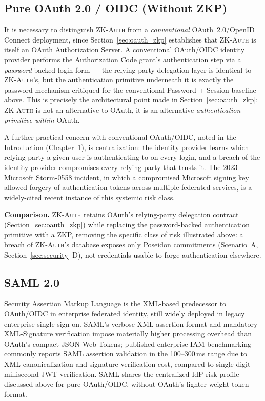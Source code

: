 \documentclass[12pt,a4paper,oneside]{report}
\begin{document}
\subsection{Pure OAuth 2.0 / OIDC (Without ZKP)}

It is necessary to distinguish \textsc{ZK-Auth} from a
\textit{conventional} OAuth~2.0/OpenID Connect deployment, since
Section~\ref{sec:oauth_zkp} establishes that \textsc{ZK-Auth} is itself
an OAuth Authorization Server. A conventional OAuth/OIDC identity
provider performs the
Authorization Code grant's authentication step via a
\textit{password}-backed login form --- the relying-party delegation
layer is identical to \textsc{ZK-Auth}'s, but the authentication
primitive underneath it is exactly the password mechanism critiqued for
the conventional Password + Session baseline above. This is precisely the architectural point made in
Section~\ref{sec:oauth_zkp}: \textsc{ZK-Auth} is not an alternative to
OAuth, it is an alternative \textit{authentication primitive within}
OAuth.

A further practical concern with conventional OAuth/OIDC, noted in the
Introduction (Chapter~1), is centralization: the identity provider
learns which relying party a given user is authenticating to on every
login, and a breach of the identity provider compromises every relying
party that trusts it. The 2023 Microsoft Storm-0558 incident, in which a
compromised Microsoft signing key allowed forgery of authentication
tokens across multiple federated services, is a widely-cited recent
instance of this systemic risk class.

\textbf{Comparison.} \textsc{ZK-Auth} retains OAuth's relying-party
delegation contract (Section~\ref{sec:oauth_zkp}) while replacing the
password-backed authentication primitive with a ZKP, removing the
specific class of risk illustrated above: a breach of \textsc{ZK-Auth}'s
database exposes only Poseidon commitments (Scenario~A,
Section~\ref{sec:security}-D), not credentials usable to forge
authentication elsewhere.

\subsection{SAML 2.0}

Security Assertion Markup Language is the XML-based
predecessor to OAuth/OIDC in enterprise federated identity, still
widely deployed in legacy enterprise single-sign-on. SAML's
verbose XML assertion format and mandatory XML-Signature verification
impose materially higher processing overhead than OAuth's compact JSON
Web Tokens; published enterprise IAM benchmarking commonly reports SAML
assertion validation in the 100--300\,ms range due to XML canonicalization
and signature verification cost, compared to single-digit-millisecond
JWT verification. SAML shares the centralized-IdP risk profile discussed
above for pure OAuth/OIDC, without OAuth's lighter-weight token format.
\end{document}
